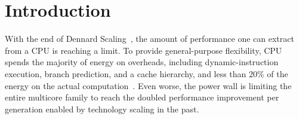 \chapter{Introduction}

With the end of Dennard Scaling~\cite{dennard}, the amount of performance one can extract from a CPU is reaching a limit.
To provide general-purpose flexibility, CPU spends the majority of energy on overheads, including dynamic-instruction execution, branch prediction, and a cache hierarchy, and less than 20\% of the energy on the actual computation~\cite{mark}.
Even worse, the power wall is limiting the entire multicore family
to reach the doubled performance improvement per generation enabled by technology scaling in the past\cite{multicorescale}.
